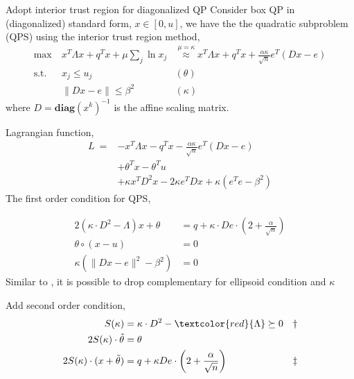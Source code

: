 \documentclass{beamerswitch}
\newcommand{\diag}{\textbf{diag}}
\newcommand{\st}{\mathrm{s.t.\;}}
\newcommand{\red}[1]{\textcolor{red}{#1}}
\begin{document}
\begin{frame}[allowframebreaks]{Adopt interior trust region for diagonalized QP}
  Consider box QP in (diagonalized) standard form, \(x \in [0, u]\), we have the the quadratic subproblem (QPS) using the interior trust region method,
  \begin{equation}\label{eq.interior.boxqp}
    \begin{aligned}
      \max ~ & x^T\Lambda x + q^Tx  + \mu \sum_j \ln x_j & \stackrel{\mu =\kappa}{\approx} x^T\Lambda x + q^Tx + \frac{\alpha \kappa}{\sqrt n} e^T(Dx-e) \\
      \st ~  & x_j \le u_j                               & (\theta)                                                                                      \\
             & \|Dx - e\| \le \beta^2                    & (\kappa)
    \end{aligned}
  \end{equation}
  where \(D = \diag(x^k)^{-1}\) is the affine scaling matrix.
  \framebreak

  Lagrangian function,
  \begin{align*}
    L ~ = & -x^T\Lambda x - q^Tx - \frac{\alpha \kappa}{\sqrt n} e^T(Dx-e) \\
          & + \theta^Tx - \theta^Tu                                        \\
          & + \kappa x^TD^2x - 2\kappa e^TDx + \kappa(e^Te - \beta^2)
  \end{align*}
  The first order condition for QPS,

  \begin{align*}
    2(\kappa \cdot D^2 - \Lambda)x + \theta         & = q + \kappa \cdot De \cdot\left (2 + \frac{\alpha}{\sqrt n} \right ) \\
    \theta \circ (x - u)                            & = 0                                                                   \\
    \kappa \left (\|Dx - e\|^2 - \beta^2   \right ) & = 0
  \end{align*}
  Similar to \cite{ye_extension_1989}, it is possible to drop complementary for ellipsoid condition and \(\kappa\)

  \framebreak
  Add second order condition,
  \begin{align*}
    S(\kappa)                             & = \kappa \cdot D^2 - \red{\Lambda} \succeq 0                    & \dagger  \\
    2S (\kappa) \cdot \tilde \theta       & = \theta                                                        &          \\
    2S (\kappa) \cdot (x + \tilde \theta) & = q + \kappa De\cdot \left (2 + \frac{\alpha}{\sqrt n} \right ) & \ddagger \\
  \end{align*}


\end{frame}
\end{document}
